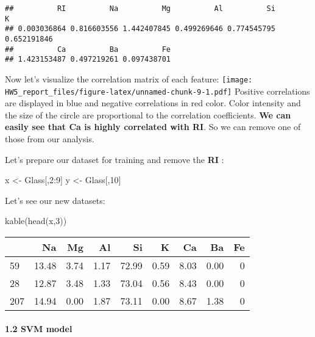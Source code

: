 \documentclass[
]{article}
\newenvironment{Shaded}{\begin{snugshade}}{\end{snugshade}}
\newcommand{\DecValTok}[1]{\textcolor[rgb]{0.00,0.00,0.81}{#1}}
\newcommand{\FunctionTok}[1]{\textcolor[rgb]{0.00,0.00,0.00}{#1}}
\newcommand{\NormalTok}[1]{#1}
\newcommand{\OtherTok}[1]{\textcolor[rgb]{0.56,0.35,0.01}{#1}}
\newcommand{\SpecialCharTok}[1]{\textcolor[rgb]{0.00,0.00,0.00}{#1}}
\begin{document}
\begin{verbatim}
##          RI          Na          Mg          Al          Si           K 
## 0.003036864 0.816603556 1.442407845 0.499269646 0.774545795 0.652191846 
##          Ca          Ba          Fe 
## 1.423153487 0.497219261 0.097438701
\end{verbatim}

Now let's visualize the correlation matrix of each feature:
\texttt{[image: HW5\_report\_files/figure-latex/unnamed-chunk-9-1.pdf]}
Positive correlations are displayed in blue and negative correlations in
red color. Color intensity and the size of the circle are proportional
to the correlation coefficients. \textbf{We can easily see that Ca is
highly correlated with RI}. So we can remove one of those from our
analysis.

Let's prepare our dataset for training and remove the \textbf{RI} :

\begin{Shaded}
\begin{Highlighting}[]
\NormalTok{x }\OtherTok{\textless{}{-}}\NormalTok{ Glass[,}\DecValTok{2}\SpecialCharTok{:}\DecValTok{9}\NormalTok{]}
\NormalTok{y }\OtherTok{\textless{}{-}}\NormalTok{ Glass[,}\DecValTok{10}\NormalTok{]}
\end{Highlighting}
\end{Shaded}

Let's see our new datasets:

\begin{Shaded}
\begin{Highlighting}[]
\FunctionTok{kable}\NormalTok{(}\FunctionTok{head}\NormalTok{(x,}\DecValTok{3}\NormalTok{))}
\end{Highlighting}
\end{Shaded}

\begin{longtable}[]{@{}lrrrrrrrr@{}}
\toprule
& Na & Mg & Al & Si & K & Ca & Ba & Fe \\
\midrule
\endhead
59 & 13.48 & 3.74 & 1.17 & 72.99 & 0.59 & 8.03 & 0.00 & 0 \\
28 & 12.87 & 3.48 & 1.33 & 73.04 & 0.56 & 8.43 & 0.00 & 0 \\
207 & 14.94 & 0.00 & 1.87 & 73.11 & 0.00 & 8.67 & 1.38 & 0 \\
\bottomrule
\end{longtable}

\hypertarget{svm-model}{%
\paragraph{1.2 SVM model}\label{svm-model}}
\end{document}
